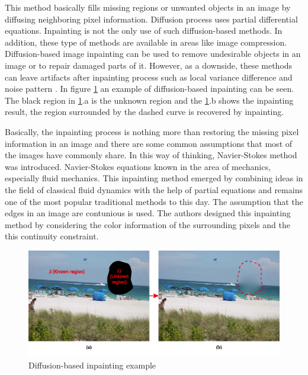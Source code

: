 This method basically fills missing regions or unwanted objects in an image by diffusing neighboring pixel information. Diffusion process uses partial differential equations. Inpainting is not the only use of such diffusion-based methods. In addition, these type of methods are available in areas like image compression. Diffusion-based image inpainting can be used to remove undesirable objects in an image or to repair damaged parts of it. However, as a downside, these methods can leave artifacts after inpainting process such as local variance difference and noise pattern \cite{diffusion_based_artifacts}. In figure \ref{fig:diffusion_based_inpainting} an example of diffusion-based inpainting can be seen. The black region in \ref{fig:diffusion_based_inpainting}.a is the unknown region and the \ref{fig:diffusion_based_inpainting}.b shows the inpainting result, the region surrounded by the dashed curve is recovered by inpainting.

Basically, the inpainting process is nothing more than restoring the missing pixel information in an image and there are some common assumptions that most of the images have commonly share. In this way of thinking, Navier-Stokes method \cite{navier_stokes} was introduced. Navier-Stokes equations known in the area of mechanics, especially fluid mechanics. This inpainting method emerged by combining ideas in the field of classical fluid dynamics with the help of partial equations and remains one of the most popular traditional methods to this day. The assumption that the edges in an image are contunious is used. The authors designed this inpainting method by considering the color information of the surrounding pixels and the this continuity constraint.

\begin{figure}[h]
    \centering
    \includegraphics[width=14cm]{figures/diffusion_based_inpainting.png}
    \caption{Diffusion-based inpainting example \cite{diffusion_based_inpainting}}
    \label{fig:diffusion_based_inpainting}
\end{figure}

